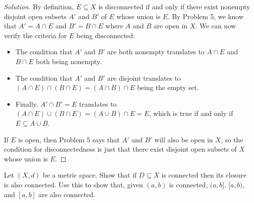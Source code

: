 \documentclass[11pt]{scrartcl}
\providecommand{\ii}{\item}
\newenvironment{soln}{\begin{proof}[Solution]}{\end{proof}}
\begin{document}
\begin{soln}
	By definition, $E\subseteq X$ is disconnected if and only if
	there exist nonempty disjoint open subsets $A'$ and $B'$ of $E$
	whose union is $E$. By Problem 5, we know that
	$A' = A\cap E$ and $B' = B\cap E$ where $A$ and $B$ are open in $X$.
	We can now verify the criteria for $E$ being disconnected:
	\begin{itemize}
		\ii The condition that $A'$ and $B'$ are both nonempty
		translates to $A\cap E$ and $B\cap E$ both being nonempty.
		\ii The condition that $A'$ and $B'$ are disjoint translates to
		$(A\cap E)\cap(B\cap E) = (A\cap B)\cap E$ being the empty set.
		\ii Finally, $A'\cap B' = E$ translates to $(A\cap E)\cup(B\cap E) =
		(A\cup B)\cap E = E$, which is true if and only if $E\subseteq A\cup B$.
	\end{itemize}
	
	If $E$ is open, then Problem 5 says that
	$A'$ and $B'$ will also be open in $X$,
	so the condition for disconnectedness is just that
	there exist disjoint open subsets of $X$ whose union is $E$.
\end{soln}

\begin{problem}
	Let $(X, d)$ be a metric space. Show that if $D\subseteq X$ is connected
	then its closure is also connected.
	Use this to show that, given $(a, b)$ is connected,
	$(a, b]$, $[a, b)$, and $[a, b]$ are also connected.
\end{problem}
\end{document}
